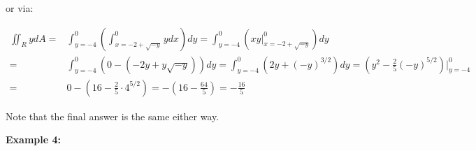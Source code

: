 \documentclass{article}
\begin{document}
or via:

\begin{align*} 
\iint_R y dA = & \int_{y = -4}^0 \left(\int_{x = -2 + \sqrt{-y}}^{0} y dx\right)dy 
= \int_{y = -4}^0 \left(xy\bigg|_{x = -2 + \sqrt{-y}}^{0}\right)dy \\ 
= & \int_{y = -4}^0 \left(0 - (-2y + y\sqrt{-y})\right)dy 
= \int_{y = -4}^0 \left(2y + (-y)^{3/2}\right)dy 
= \left(y^2 - \frac{2}{5}(-y)^{5/2}\right)\bigg|_{y = -4}^0 \\
= & 0 - (16 - \frac{2}{5} \cdot 4^{5/2})   
= -(16 - \frac{64}{5})
= -\frac{16}{5}
\end{align*} 

Note that the final answer is the same either way.




\pagebreak

\textbf{Example 4:}  

\vspace{5mm}
\end{document}
